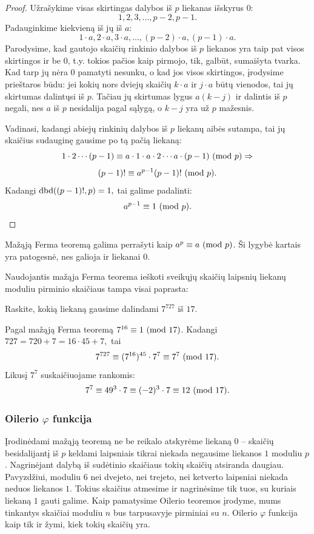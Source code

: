\begin{proof}
  Užrašykime visas skirtingas dalybos iš $p$ liekanas išskyrus $0$:
  $$1, 2, 3, \dots, p-2, p-1.$$
  Padauginkime kiekvieną iš jų iš $a$:
  $$1\cdot a, 2\cdot a, 3\cdot a, \dots, (p-2)\cdot a, (p-1)\cdot a.$$
  Parodysime, kad gautojo skaičių rinkinio dalybos iš $p$ liekanos yra taip
  pat visos skirtingos ir be 0, t.y. tokios pačios kaip pirmojo, tik, galbūt,
  sumaišyta tvarka. Kad tarp jų nėra 0 pamatyti nesunku, o kad jos visos
  skirtingos, įrodysime prieštaros būdu: jei kokių nors dviejų skaičių
  $k\cdot a$ ir $j\cdot a$ būtų vienodos, tai jų skirtumas dalintųsi iš
  $p$. Tačiau jų skirtumas lygus $a(k-j)$ ir dalintis iš $p$ negali, nes
  $a$ iš $p$ nesidalija pagal sąlygą, o $k-j$ yra už $p$ mažesnis. 

  Vadinasi, kadangi abiejų rinkinių dalybos iš $p$ liekanų aibės sutampa,
  tai jų skaičius sudauginę gausime po tą pačią liekaną:
  $$1\cdot 2 \cdots (p-1) \equiv a \cdot 1 \cdot a \cdot 2 \cdots a \cdot
  (p-1)\ (\text{mod } p)\Rightarrow$$
  $$(p-1)!\equiv a^{p-1}(p-1)!\ (\text{mod } p).$$
  Kadangi $\operatorname{dbd}((p-1)!,p)=1,$ tai galime padalinti:
  $$a^{p-1}\equiv 1 \ (\text{mod } p).$$
\end{proof}

\begin{pastaba}
  Mažąją Ferma teoremą galima perrašyti kaip $a^p \equiv a \ (\text{mod } p)$. Ši
  lygybė kartais yra patogesnė, nes galioja ir liekanai $0$.
\end{pastaba}
  
Naudojantis mažąja Ferma teorema ieškoti sveikųjų skaičių laipsnių liekanų
moduliu pirminio skaičiaus tampa visai paprasta:

\begin{pav}
  Raskite, kokią liekaną gausime dalindami $7^{727}$ iš $17$.
\end{pav}

Pagal mažąją Ferma teoremą $7^{16}\equiv 1 \ (\text{mod } 17)$. Kadangi $727 = 720 + 7
= 16\cdot 45 + 7,$ tai $$7^{727} \equiv (7^{16})^{45}\cdot 7^7\equiv 7^7
\ (\text{mod } 17).$$ Likusį $7^7$ suskaičiuojame rankomis: $$7^7 \equiv 49^3\cdot 7
\equiv (-2)^3\cdot 7\equiv 12 \ (\text{mod } 17).$$

\subsubsection{Oilerio $\varphi$ funkcija}

Įrodinėdami mažąją teoremą ne be reikalo atskyrėme liekaną $0$ -- skaičių
besidalijantį iš $p$ keldami laipsniais tikrai niekada negausime liekanos
$1$ moduliu $p$. Nagrinėjant dalybą iš sudėtinio skaičiaus tokių skaičių
atsiranda daugiau. Pavyzdžiui, moduliu $6$ nei dvejeto, nei trejeto, nei
ketverto laipsniai niekada neduos liekanos $1$. Tokius skaičius atmesime ir
nagrinėsime tik tuos, su kuriais liekaną $1$ gauti galime. Kaip pamatysime Oilerio
teoremos įrodyme, mums tinkantys skaičiai moduliu $n$ bus tarpusavyje
pirminiai su $n$. Oilerio $\varphi$ funkcija kaip tik ir žymi, kiek tokių
skaičių yra.

